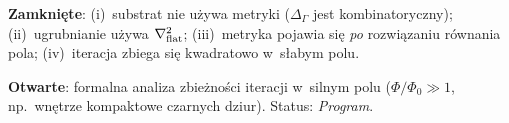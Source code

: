 \begin{remark}%
\label{rem:circularity-status}
\textbf{Zamkni\k{e}te}: (i)~substrat nie u\.zywa metryki
($\Delta_\Gamma$ jest kombinatoryczny);
(ii)~ugrubnianie u\.zywa $\nabla^2_{\rm flat}$;
(iii)~metryka pojawia si\k{e} \emph{po} rozwi\k{a}zaniu r\'ownania pola;
(iv)~iteracja zbiega si\k{e} kwadratowo w~s\l{}abym polu.

\textbf{Otwarte}: formalna analiza zbie\.zno\'sci iteracji
w~silnym polu ($\Phi/\Phi_0 \gg 1$, np.~wn\k{e}trze kompaktowe
czarnych dziur). Status: \emph{Program}.
\end{remark}
